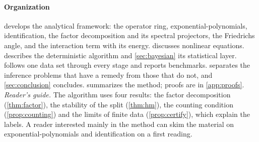 \documentclass[11pt]{article}
\theoremstyle{plain}
\theoremstyle{definition}
\theoremstyle{remark}
\begin{document}
\paragraph{Organization}  develops the analytical framework: the operator ring, exponential-polynomials,
identification, the factor decomposition and its spectral projectors, the Friedrichs angle, and the interaction term with
its energy.  discusses nonlinear equations.  describes the deterministic
algorithm and \cref{sec:bayesian} its statistical layer.  follows one data set through every stage and
reports benchmarks.  separates the inference problems that have a remedy from those that do not, and
\cref{sec:conclusion} concludes.  summarizes the method; proofs are in \cref{app:proofs}. \emph{Reader's guide.} The algorithm uses four results: the factor decomposition (\cref{thm:factor}), the
stability of the split (\cref{thm:hm}), the counting condition (\cref{prop:counting}) and the limits of finite data
(\cref{prop:certify}), which explain the labels. A reader interested mainly in the method can skim the material on
exponential-polynomials and identification on a first reading.
\end{document}
